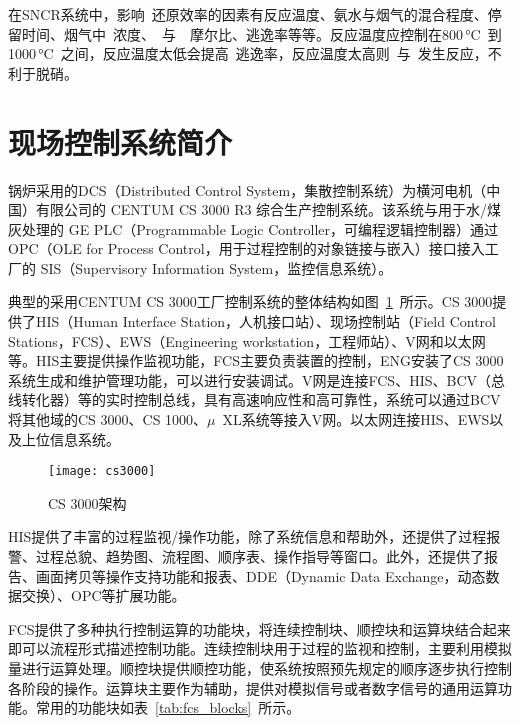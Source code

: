 在SNCR系统中，影响~还原效率的因素有反应温度、氨水与烟气的混合程度、停留时间、烟气中~浓度、~与~~摩尔比、逃逸率等等。反应温度应控制在800$\,$\si{\degreeCelsius}~到1000$\,$\si{\degreeCelsius}~之间，反应温度太低会提高~逃逸率，反应温度太高则~与~发生反应，不利于脱硝。

\section{现场控制系统简介}
锅炉采用的DCS（Distributed Control System，集散控制系统）为横河电机（中国）有限公司的 CENTUM CS 3000 R3 综合生产控制系统。该系统与用于水/煤灰处理的 GE PLC（Programmable Logic Controller，可编程逻辑控制器）通过 OPC（OLE for Process Control，用于过程控制的对象链接与嵌入）接口接入工厂的 SIS（Supervisory Information System，监控信息系统）。

典型的采用CENTUM CS 3000工厂控制系统的整体结构如图~\ref{fig:cs3000}~所示。CS 3000提供了HIS（Human Interface Station，人机接口站）、现场控制站（Field Control Stations，FCS）、EWS（Engineering workstation，工程师站）、V网和以太网等\cite{konishi2000system}。HIS主要提供操作监视功能，FCS主要负责装置的控制，ENG安装了CS 3000系统生成和维护管理功能，可以进行安装调试。V网是连接FCS、HIS、BCV（总线转化器）等的实时控制总线，具有高速响应性和高可靠性，系统可以通过BCV将其他域的CS 3000、CS 1000、$\mu$~XL系统等接入V网。以太网连接HIS、EWS以及上位信息系统\cite{emori1997communication}。

\begin{figure}[!htb]
\centering
\texttt{[image: cs3000]}
\caption{CS 3000架构} \label{fig:cs3000}
\end{figure}

HIS提供了丰富的过程监视/操作功能，除了系统信息和帮助外，还提供了过程报警、过程总貌、趋势图、流程图、顺序表、操作指导等窗口。此外，还提供了报告、画面拷贝等操作支持功能和报表、DDE（Dynamic Data Exchange，动态数据交换）、OPC等扩展功能。

FCS提供了多种执行控制运算的功能块，将连续控制块、顺控块和运算块结合起来即可以流程形式描述控制功能。连续控制块用于过程的监视和控制，主要利用模拟量进行运算处理。顺控块提供顺控功能，使系统按照预先规定的顺序逐步执行控制各阶段的操作。运算块主要作为辅助，提供对模拟信号或者数字信号的通用运算功能。常用的功能块如表~\ref{tab:fcs_blocks}~所示。

